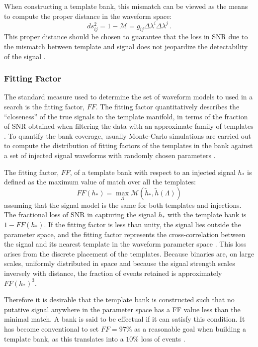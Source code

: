 \documentclass[binding=0.6cm, LaM]{sapthesis}
\begin{document}
        When constructing a template bank, this mismatch can be viewed as the means
	to compute the proper distance in the waveform space:
        \begin{equation}
          ds_{ij}^2 = 1 − \mathcal{M} = g_{ij} \Delta \lambda^i \Delta \lambda^j\,.
        \end{equation}
	This proper distance should be chosen to guarantee that the loss in SNR due to the mismatch 
	between template and signal does not jeopardize the detectability of the signal \cite{30}.

\subsubsection{Fitting Factor}
\label{subsec:fittingfactor}
	The standard measure used to determine the set of waveform models to used in a
        search is the fitting factor, $FF$.
	The fitting factor quantitatively describes the ``closeness'' of 
	the true signals to the template manifold, in terms of the fraction of 
	SNR obtained when filtering 
	the data with an approximate family of templates \cite{31}. 
	To quantify the bank coverage, usually Monte-Carlo simulations are carried out   
	to compute the distribution of fitting factors of the templates in the bank against 
	a set of injected signal waveforms with randomly chosen parameters \cite{32}.

	The fitting factor, $FF$, of a template bank with respect to an injected signal $h_{*}$ 
	is defined as the maximum value of match over all the templates:
        \begin{equation}
          FF(h_{*}) = \max_\Lambda \mathcal{M}(\tilde{h}_{*}, \tilde{h}(\Lambda))
        \end{equation}
	assuming that the signal model is the same for both templates and injections. 
	The fractional loss of SNR in capturing the signal 
	$h_{*}$ with the template bank is $1 - FF(h_{*})$.
	If the fitting factor is less than unity, the signal lies outside the parameter space, 
	and the fitting factor represents the cross-correlation between 
	the signal and its nearest template in the waveform parameter space \cite{33}. 
	This loss arises from the discrete placement of the templates. 
	Because binaries are, on large scales, uniformly distributed in space 
	and because the signal strength scales inversely with distance, 
	the fraction of events retained is approximately $FF(h_*)^3$.

	Therefore it is desirable that the template bank is constructed such that 
	no putative signal anywhere in the parameter space
	has a FF value less than the minimal match. 
	A bank is said to be effectual if it can satisfy this condition.
	It has become conventional to set $FF = 97\%$ as a reasonable goal when building a template bank, 
	as this translates into a $10\%$ loss of events \cite{33}.
\end{document}
